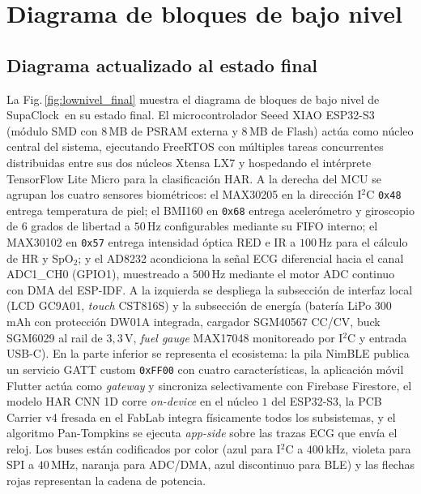 \documentclass[letterpaper,11pt]{article}
\newcommand{\rfigura}[1]{Fig.\,\ref{#1}}
\newcommand{\NombreProyecto}{SupaClock}
\begin{document}
\newpage

\section{Diagrama de bloques de bajo nivel}\label{sec:diagrama}

\subsection{Diagrama actualizado al estado final}

La \rfigura{fig:lownivel_final} muestra el diagrama de bloques de bajo nivel de \NombreProyecto\ en su estado final. El microcontrolador Seeed XIAO ESP32-S3 (m\'odulo SMD con 8\,MB de PSRAM externa y 8\,MB de Flash) act\'ua como n\'ucleo central del sistema, ejecutando FreeRTOS con m\'ultiples tareas concurrentes distribuidas entre sus dos n\'ucleos Xtensa LX7 y hospedando el int\'erprete TensorFlow Lite Micro para la clasificaci\'on HAR. A la derecha del MCU se agrupan los cuatro sensores biom\'etricos: el MAX30205 en la direcci\'on I$^2$C \texttt{0x48} entrega temperatura de piel; el BMI160 en \texttt{0x68} entrega aceler\'ometro y giroscopio de 6 grados de libertad a $50$\,Hz configurables mediante su FIFO interno; el MAX30102 en \texttt{0x57} entrega intensidad \'optica RED e IR a $100$\,Hz para el c\'alculo de HR y SpO$_2$; y el AD8232 acondiciona la se\~nal ECG diferencial hacia el canal ADC1\_CH0 (GPIO1), muestreado a $500$\,Hz mediante el motor ADC continuo con DMA del ESP-IDF. A la izquierda se despliega la subsecci\'on de interfaz local (LCD GC9A01, \textit{touch} CST816S) y la subsecci\'on de energ\'ia (bater\'ia LiPo $300$\,mAh con protecci\'on DW01A integrada, cargador SGM40567 CC/CV, buck SGM6029 al rail de $3{,}3$\,V, \textit{fuel gauge} MAX17048 monitoreado por I$^2$C y entrada USB-C). En la parte inferior se representa el ecosistema: la pila NimBLE publica un servicio GATT custom \texttt{0xFF00} con cuatro caracter\'isticas, la aplicaci\'on m\'ovil Flutter act\'ua como \textit{gateway} y sincroniza selectivamente con Firebase Firestore, el modelo HAR CNN 1D corre \textit{on-device} en el n\'ucleo $1$ del ESP32-S3, la PCB Carrier v4 fresada en el FabLab integra f\'isicamente todos los subsistemas, y el algoritmo Pan-Tompkins se ejecuta \textit{app-side} sobre las trazas ECG que env\'ia el reloj. Los buses est\'an codificados por color (azul para I$^2$C a $400$\,kHz, violeta para SPI a $40$\,MHz, naranja para ADC/DMA, azul discontinuo para BLE) y las flechas rojas representan la cadena de potencia.
\end{document}
